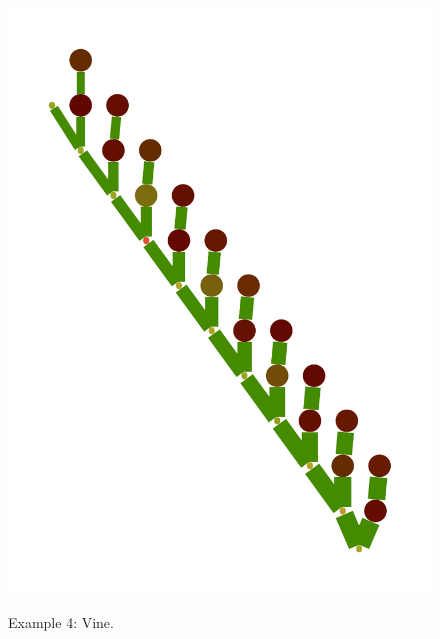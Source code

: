 \documentclass[a4paper,10pt]{article}
\begin{document}
\begin{figure}
{    \includegraphics[scale=.14]{./figures/6-4-vine-induced-9.pdf}
    \label{fig:exp-vine-induced}    
    }
  \caption{Example 4: Vine.}
  \label{fig:exp-vine}
\end{figure}
\end{document}
